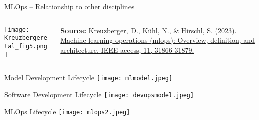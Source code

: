 \documentclass[ignorenonframetext,xcolor=x11names]{beamer}
\begin{document}
\begin{frame}{MLOps -- Relationship to other disciplines}
\begin{columns}
\begin{column}{.9\textwidth}
\centering
\texttt{[image: Kreuzbergeretal\_fig5.png]}
\end{column}
\begin{column}{.15\textwidth}
\tiny \textbf{Source:} \href{https://ieeexplore.ieee.org/abstract/document/10081336}{Kreuzberger, D., K\"uhl, N., \& Hirschl, S. (2023). Machine learning operations (mlops): Overview, definition, and architecture. IEEE access, 11, 31866-31879.}
\end{column}
\end{columns}
\end{frame}


\begin{frame}{Model Development Lifecycle}
\texttt{[image: mlmodel.jpeg]}
\end{frame}

\begin{frame}{Software Development Lifecycle}
\texttt{[image: devopsmodel.jpeg]}
\end{frame}


\begin{frame}{MLOps Lifecycle}
\texttt{[image: mlops2.jpeg]}
\end{frame}
\end{document}
